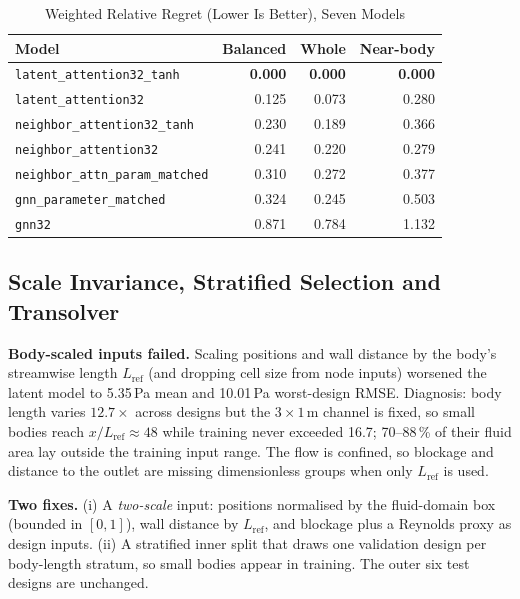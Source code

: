 \documentclass[journal]{IEEEtran}
\begin{document}
\begin{table}[!t]
\centering
\caption{Weighted Relative Regret (Lower Is Better), Seven Models}
\label{tab:rank}
\setlength{\tabcolsep}{3.5pt}
\begin{tabular}{lrrr}
\toprule
Model & Balanced & Whole & Near-body \\
\midrule
\texttt{latent\_attention32\_tanh} & \textbf{0.000} & \textbf{0.000} & \textbf{0.000} \\
\texttt{latent\_attention32} & 0.125 & 0.073 & 0.280 \\
\texttt{neighbor\_attention32\_tanh} & 0.230 & 0.189 & 0.366 \\
\texttt{neighbor\_attention32} & 0.241 & 0.220 & 0.279 \\
\texttt{neighbor\_attn\_param\_matched} & 0.310 & 0.272 & 0.377 \\
\texttt{gnn\_parameter\_matched} & 0.324 & 0.245 & 0.503 \\
\texttt{gnn32} & 0.871 & 0.784 & 1.132 \\
\bottomrule
\end{tabular}
\end{table}

\subsection{Scale Invariance, Stratified Selection and Transolver}
\label{sec:exp_transolver}
\textbf{Body-scaled inputs failed.} Scaling positions and wall distance by the
body's streamwise length $L_\mathrm{ref}$ (and dropping cell size from node
inputs) worsened the latent model to 5.35\,Pa mean and 10.01\,Pa worst-design
RMSE. Diagnosis: body length varies $12.7\times$ across designs but the
$3\times1$\,m channel is fixed, so small bodies reach $x/L_\mathrm{ref}\approx48$
while training never exceeded 16.7; 70--88\,\% of their fluid area lay outside
the training input range. The flow is confined, so blockage and distance to the
outlet are missing dimensionless groups when only $L_\mathrm{ref}$ is used.

\textbf{Two fixes.} (i) A \emph{two-scale} input: positions normalised by the
fluid-domain box (bounded in $[0,1]$), wall distance by $L_\mathrm{ref}$, and
blockage plus a Reynolds proxy as design inputs. (ii) A stratified inner split
that draws one validation design per body-length stratum, so small bodies appear
in training. The outer six test designs are unchanged.
\end{document}
